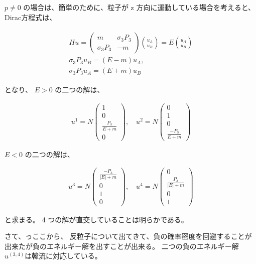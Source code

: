 \documentclass[titlepage]{ltjsarticle}
\begin{document}
\(p \neq 0\) の場合は、簡単のために、粒子が z 方向に運動している場合を考えると、Dirac方程式は、

\begin{align*}
\begin{gathered}
H u=\left(\begin{array}{cc}
m & \sigma_3 P_3 \\
\sigma_3 P_3 & -m
\end{array}\right)\binom{u_A}{u_B}=E\binom{u_A}{u_B} \\
\sigma_3 P_3 u_B=(E-m) u_A, \\
\sigma_3 P_3 u_A=(E+m) u_B
\end{gathered}
\end{align*}


となり、 \(E>0\) の二つの解は、

\begin{align*}
u^1=N\left(\begin{array}{c}
1 \\
0 \\
\frac{P_3}{E+m} \\
0
\end{array}\right), \quad u^2=N\left(\begin{array}{c}
0 \\
1 \\
0 \\
\frac{-P_3}{E+m}
\end{array}\right)
\end{align*}

\(E<0\) の二つの解は、

\begin{align*}
u^3=N\left(\begin{array}{c}
\frac{-P_3}{|E|+m} \\
0 \\
1 \\
0
\end{array}\right), \quad u^4=N\left(\begin{array}{c}
0 \\
\frac{P_3}{|E|+m} \\
0 \\
1
\end{array}\right)
\end{align*}


と求まる。
4 つの解が直交していることは明らかである。


さて、っここから、
反粒子について出てきて、負の確率密度を回避することが出来たが負のエネルギー解を出すことが出来る。
二つの負のエネルギー解\(u^{(3,4)}\)は韓流に対応している。
\end{document}
